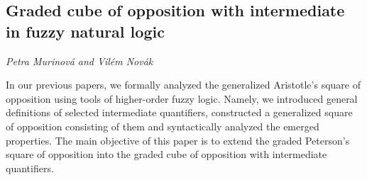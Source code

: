 \documentclass[../booklet.tex]{subfiles}
\begin{document}
\subsection[Graded cube of opposition with intermediate in fuzzy natural logic. {\it Petra Murinová and Vilém Novák}]{Graded cube of opposition with intermediate in fuzzy natural logic}
 

\begin{center}
  {\it Petra Murinová and Vilém Novák}
\end{center}



In our previous papers, we formally analyzed the generalized Aristotle's square of opposition using tools of higher-order fuzzy logic. Namely, we introduced general definitions of selected intermediate quantifiers, constructed a generalized square of opposition consisting of them and syntactically analyzed the emerged properties. The main objective of this paper is to extend the graded Peterson's square of opposition into the graded cube of opposition with intermediate quantifiers.

\end{document}
